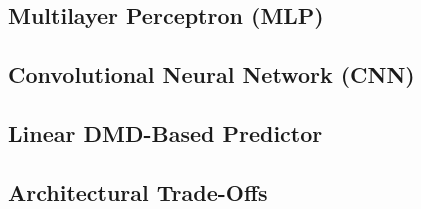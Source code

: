 \subsection{Multilayer Perceptron (MLP)}

%


\subsection{Convolutional Neural Network (CNN)}

%
%


\subsection{Linear DMD-Based Predictor}

%

\subsection{Architectural Trade-Offs}




